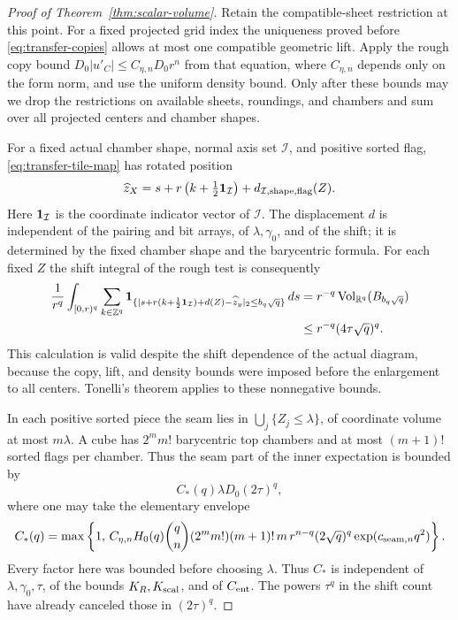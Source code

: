\begin{proof}[Proof of Theorem~\ref{thm:scalar-volume}]
Retain the compatible-sheet restriction at this point.  For a fixed
projected grid index the uniqueness proved before
\eqref{eq:transfer-copies} allows at most one compatible geometric
lift.  Apply the rough copy bound
\(D_0|u'_C|\leq C_{\eta,n}D_0r^n\) from that equation, where
\(C_{\eta,n}\) depends only on the form norm, and use the uniform
density bound.  Only after these bounds may we drop the restrictions
on available sheets, roundings, and chambers and sum over all projected
centers and chamber shapes.

For a fixed actual chamber shape, normal axis set \(\mathcal I\), and
positive sorted flag, \eqref{eq:transfer-tile-map} has rotated position
\[
 \widehat z_X=s+r\left(k+\tfrac12\mathbf 1_{\mathcal I}\right)
                       +d_{\mathcal I,\mathrm{shape},\mathrm{flag}}(Z).
\]
Here \(\mathbf 1_{\mathcal I}\) is the coordinate indicator vector of
\(\mathcal I\).
The displacement \(d\) is independent of the pairing and bit arrays,
of \(\lambda,\gamma_0\), and of the shift; it is determined by the
fixed chamber shape and the barycentric formula.  For each fixed \(Z\)
the shift integral of the rough test is consequently
\[
 \begin{split}
 \frac1{r^q}\int_{[0,r)^q}\sum_{k\in\mathbb Z^q}
  \mathbf 1_{\{|s+r(k+\frac12\mathbf 1_{\mathcal I})+d(Z)-\widehat z_y|_2
                  \leq b_q\sqrt q\}}\,ds
 &=r^{-q}\operatorname{Vol}_{\mathbb R^q}(B_{b_q\sqrt q})\\
 &\leq r^{-q}(4\tau\sqrt q)^q.
 \end{split}
\]
This calculation is valid despite the shift dependence of the actual
diagram, because the copy, lift, and density bounds were imposed before
the enlargement to all centers.  Tonelli's theorem applies to these
nonnegative bounds.

In each positive sorted piece the seam lies in
\(\bigcup_j\{Z_j\leq\lambda\}\), of coordinate volume at most
\(m\lambda\).  A cube has \(2^m m!\) barycentric top chambers and
at most \((m+1)!\) sorted flags per chamber.  Thus the seam part of
the inner expectation is bounded by
\begin{equation}\label{eq:transfer-seam-average}
                    C_*(q)\lambda D_0(2\tau)^q,
\end{equation}
where one may take the elementary envelope
\[
 C_*(q)=\max\left\{1,\,
 C_{\eta,n}H_0(q)\binom qn(2^m m!)(m+1)!\,m\,
 r^{n-q}(2\sqrt q)^q\exp(c_{{\rm seam},n}q^2)\right\}.
\]
Every factor here was bounded before choosing \(\lambda\).  Thus
\(C_*\) is independent of \(\lambda,\gamma_0,\tau\), of the bounds
\(K_R,K_{\rm scal}\), and of \(C_{\rm ent}\).  The powers \(\tau^q\) in the shift
count have already canceled those in \((2\tau)^q\).


\end{proof}
